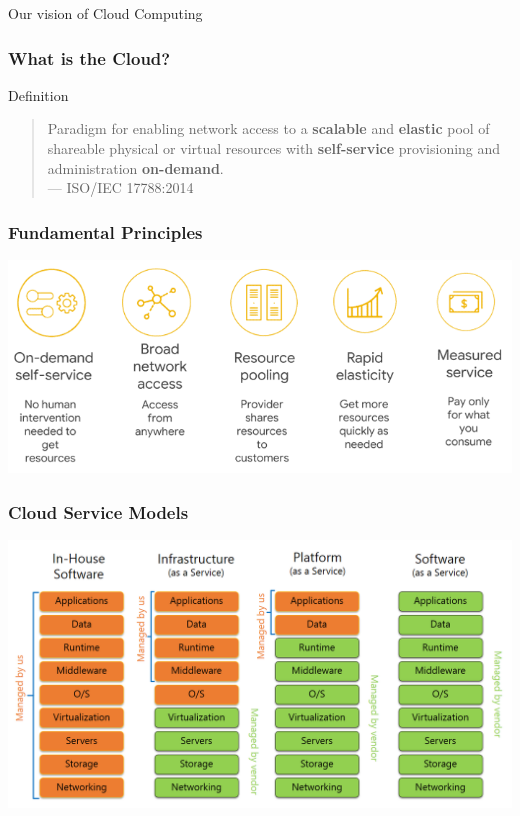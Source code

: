 \documentclass[10pt,aspectratio=1609]{beamer}
\begin{document}
\begin{section}{Our vision of Cloud Computing}
  \begin{frame}
    \frametitle{What is the Cloud?}
      \begin{minipage}[t][5cm][t]{\textwidth}
        \begin{alertblock}{Definition}
        \begin{quote}
          Paradigm for enabling network access to a \textbf<2>{scalable} and \textbf<2>{elastic} pool of shareable physical
          or virtual resources with \textbf<2>{self-service} provisioning and administration \textbf<2>{on-demand}.
          \\
          --- ISO/IEC 17788:2014
        \end{quote}
      \end{alertblock}

    \end{minipage}
  \end{frame}

  \begin{frame}
    \frametitle{Fundamental Principles}
    \centering
    \vfill
    \includegraphics[width=\textwidth]{cloud-fundamentals.png}
  \end{frame}

\begin{frame}
  \frametitle{Cloud Service Models}
  \centering
  \vfill
  \includegraphics[width=\textwidth]{saas.png}
\end{frame}


\end{section}
\end{document}
